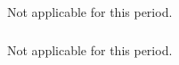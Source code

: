  \subparagraph{}
  \label{hpc@hpc-pythran}
  Not applicable for this period.





  \subparagraph{}
  \label{hpc@hpc-jupyter}
  
  Not applicable for this period.

